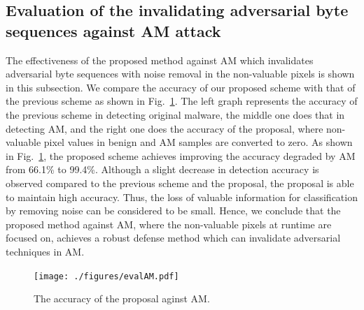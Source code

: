 \documentclass{ieeeaccess}
\newcommand{\myfigurename}{Fig.}
\begin{document}
\subsection{Evaluation of the invalidating adversarial byte sequences against AM attack}
The effectiveness of the proposed method against AM which invalidates adversarial byte sequences with noise removal in the non-valuable pixels is shown in this subsection.
We compare the accuracy of our proposed scheme with that of the previous scheme as shown in \myfigurename~\ref{fig:evalAM}.
The left graph represents the accuracy of the previous scheme in detecting original malware, the middle one does that in detecting AM, and the right one does the accuracy of the proposal, where non-valuable pixel values in benign and AM samples are converted to zero.
As shown in \myfigurename~\ref{fig:evalAM}, the proposed scheme achieves improving the accuracy degraded by AM from 66.1\% to 99.4\%.
Although a slight decrease in detection accuracy is observed compared to the previous scheme and the proposal, the proposal is able to maintain high accuracy.
Thus, the loss of valuable information for classification by removing noise can be considered to be small.
Hence, we conclude that the proposed method against AM, where the non-valuable pixels at runtime are focused on, achieves a robust defense method which can invalidate adversarial techniques in AM.

\begin{figure}[t]
 \centering
 \texttt{[image: ./figures/evalAM.pdf]}
 \caption{The accuracy of the proposal aginst AM.} 
 \label{fig:evalAM}
\end{figure}
\end{document}
